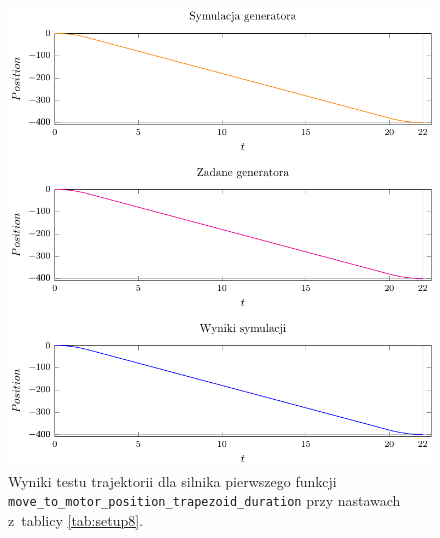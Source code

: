 \documentclass[a4paper, 12pt]{article}
\begin{document}
	\begin{figure}[H]
		\centering
		\includegraphics[scale=1.2]{raport_graphs/simpMPDrevers.pdf}
		\caption{Wyniki testu trajektorii dla silnika pierwszego funkcji \texttt{move\_to\_motor\_position\_trapezoid\_duration} przy nastawach z~tablicy \ref{tab:setup8}.}
		\label{fig:simpMPDrevers}
	\end{figure}
		
\end{document}
